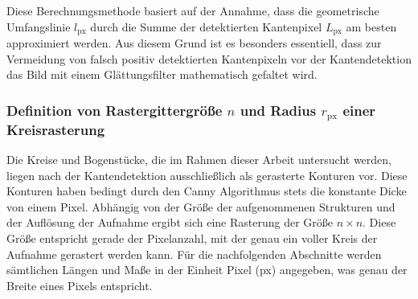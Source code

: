 \documentclass[accentcolor=tud1c, 11pt, toc=bib, toc=listof, captions=abovetable, parskip=half]{tudreport}
\begin{document}
Diese Berechnungsmethode basiert auf der Annahme, dass die geometrische Umfangslinie $l_{\text{px}}$ durch die Summe der detektierten Kantenpixel $L_{\text{px}}$ am besten approximiert werden. Aus diesem Grund ist es besonders essentiell, dass zur Vermeidung von falsch positiv detektierten Kantenpixeln vor der Kantendetektion das Bild mit einem Glättungsfilter mathematisch gefaltet wird. \\

\subsubsection{Definition von Rastergittergröße $n$ und Radius $r_{\text{px}}$ einer Kreisrasterung}
Die Kreise und Bogenstücke, die im Rahmen dieser Arbeit untersucht werden, liegen nach der Kantendetektion ausschließlich als gerasterte Konturen vor. Diese Konturen haben bedingt durch den Canny Algorithmus stets die konstante Dicke von einem Pixel. Abhängig von der Größe der aufgenommenen Strukturen und der Auflösung der Aufnahme ergibt sich eine Rasterung der Größe $n \times n$. Diese Größe entspricht gerade der Pixelanzahl, mit der genau ein voller Kreis der Aufnahme gerastert werden kann. Für die nachfolgenden Abschnitte werden sämtlichen Längen und Maße in der Einheit Pixel (px) angegeben, was genau der Breite eines Pixels entspricht. \\
\end{document}

